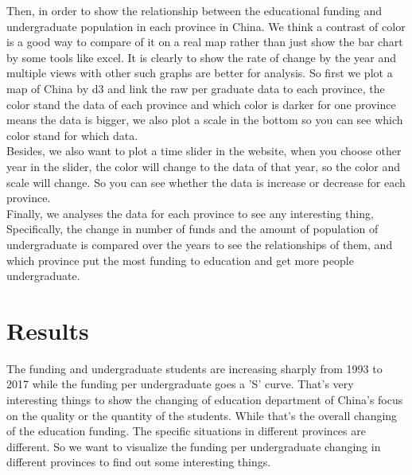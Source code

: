 \noindent Then, in order to show the relationship between the educational funding and undergraduate population in each province in China. \cite{graves2013visualization}We think a contrast of color is a good way to compare of it on a real map rather than just show the bar chart by some tools like excel. \cite{bao2014visual}It is clearly to show the rate of change by the year and multiple views with other such graphs are better for analysis. So first we plot a map of China by d3 and link the raw per graduate data to each province, the color stand the data of each province and which color is darker for one province means the data is bigger, we also plot a scale in the bottom so you can see which color stand for which data.\cite{harper2014deconstructing} \\

\noindent Besides, we also want to plot a time slider in the website\cite{wang2008importance}, when you choose other year in the slider, the color will change to the data of that year\cite{healey1996choosing}, so the color and scale will change. \cite{zastrow2015data}So you can see whether the data is increase or decrease for each province.\\

\noindent Finally, we analyses the data for each province to see any interesting thing, Specifically, the change in number of funds and the amount of population of undergraduate is compared over the years to see the relationships of them,\cite{tsang1996financia} and which province put the most funding to education and get more people undergraduate.

\timeline

\section{Results}
\label{sec:results}

\map

The funding and undergraduate students are increasing sharply from 1993 to 2017 while the funding per undergraduate goes a 'S' curve. That's very interesting things to show the changing of education department of China's focus on the quality or the quantity of the students. While that's the overall changing of the education funding. The specific situations in different provinces are different. So we want to visualize the funding per undergraduate changing in different provinces to find out some interesting things.

